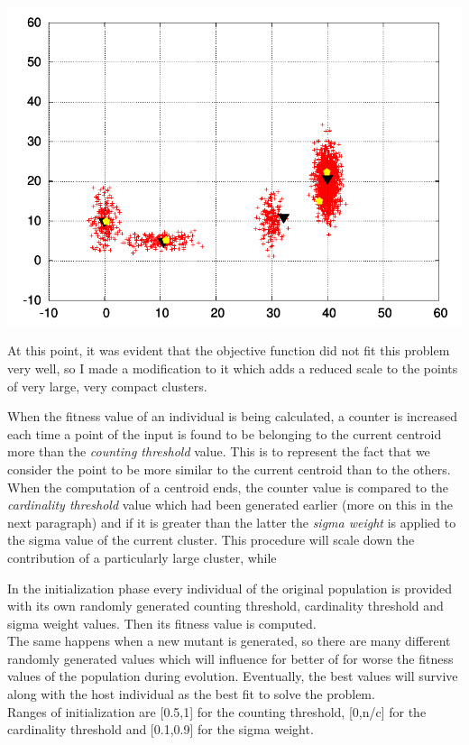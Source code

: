 \documentclass[a4paper]{article}
\begin{document}
\vspace{-20pt}
\begin{center}
\includegraphics[scale=0.60]{gauss4_mid_full.pdf}
\end{center}

At this point, it was evident that the objective function did not fit this problem very well, so I made a modification to it which adds a reduced scale to the points of very large, very compact clusters.

When the fitness value of an individual is being calculated, a counter is increased each time a point of the input is found to be belonging to the current centroid more than the \emph{counting threshold} value. This is to represent the fact that we consider the point to be more similar to the current centroid than to the others. When the computation of a centroid ends, the counter value is compared to the \emph{cardinality threshold} value which had been generated earlier (more on this in the next paragraph) and if it is greater than the latter the \emph{sigma weight} is applied to the sigma value of the current cluster. This procedure will scale down the contribution of a particularly large cluster, while 

In the initialization phase every individual of the original population is provided with its own randomly generated counting threshold, cardinality threshold and sigma weight values. Then its fitness value is computed.\\
The same happens when a new mutant is generated, so there are many different randomly generated values which will influence for better of for worse the fitness values of the population during evolution. Eventually, the best values will survive along with the host individual as the best fit to solve the problem.\\
Ranges of initialization are [0.5,1] for the counting threshold, [0,n/c] for the cardinality threshold and [0.1,0.9] for the sigma weight.
\end{document}
